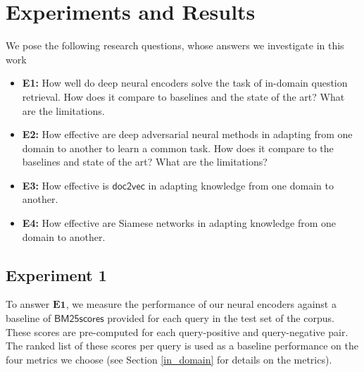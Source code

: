 \documentclass{sigkddExp}
\begin{document}


\section{Experiments and Results}
\label{experiments}
We pose the following research questions, whose answers we investigate in this work
\begin{itemize}[topsep=0pt,itemsep=-1ex,partopsep=1ex,parsep=1ex]
\item \textbf{E1:} How well do deep neural encoders solve the task of in-domain question retrieval. How does it compare to baselines and the state of the art? What are the limitations.
\item \textbf{E2:} How effective are deep adversarial neural methods in adapting from one domain to another to learn a common task. How does it compare to the baselines and state of the art? What are the limitations?
\item \textbf{E3:} How effective is $\mathsf{doc2vec}$ in adapting knowledge from one domain to another.
\item \textbf{E4:} How effective are Siamese networks in adapting knowledge from one domain to another.
\end{itemize}

\subsection{Experiment 1}
To answer $\mathbf{E1}$, we measure the performance of our neural encoders against a baseline of $\mathsf{BM25 scores}$ provided for each query in the test set of the corpus. These scores are pre-computed for each query-positive and query-negative pair. The ranked list of these scores per query is used as a baseline performance on the four metrics we choose (see Section \ref{in_domain} for details on the metrics).
\end{document}
